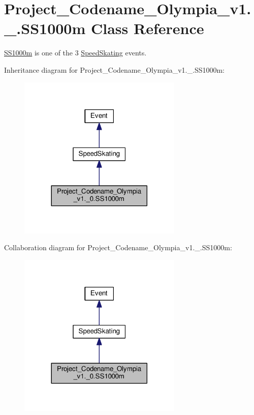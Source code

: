 \hypertarget{classProject__Codename__Olympia__v1_1_1__0_1_1SS1000m}{}\section{Project\+\_\+\+Codename\+\_\+\+Olympia\+\_\+v1.\+\_.\+S\+S1000m Class Reference}
\label{classProject__Codename__Olympia__v1_1_1__0_1_1SS1000m}


\hyperlink{classProject__Codename__Olympia__v1_1_1__0_1_1SS1000m}{S\+S1000m} is one of the 3 \hyperlink{classProject__Codename__Olympia__v1_1_1__0_1_1SpeedSkating}{Speed\+Skating} events.  




Inheritance diagram for Project\+\_\+\+Codename\+\_\+\+Olympia\+\_\+v1.\+\_.\+S\+S1000m\+:
\nopagebreak
\begin{figure}[H]
\begin{center}
\leavevmode
\includegraphics[width=221pt]{classProject__Codename__Olympia__v1_1_1__0_1_1SS1000m__inherit__graph}
\end{center}
\end{figure}


Collaboration diagram for Project\+\_\+\+Codename\+\_\+\+Olympia\+\_\+v1.\+\_.\+S\+S1000m\+:
\nopagebreak
\begin{figure}[H]
\begin{center}
\leavevmode
\includegraphics[width=221pt]{classProject__Codename__Olympia__v1_1_1__0_1_1SS1000m__coll__graph}
\end{center}
\end{figure}
